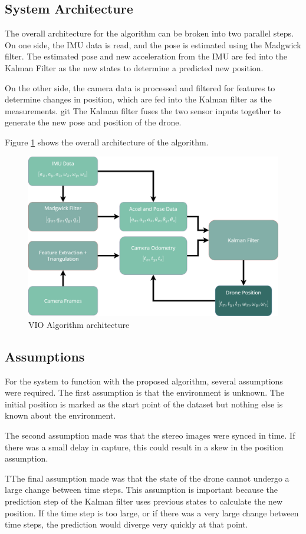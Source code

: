 \documentclass[bare_jrnl_transmag]{subfiles}
\begin{document}
\subsection{System Architecture}

The overall architecture for the algorithm can be broken into two parallel steps. On one side, the IMU data is read, and the pose is estimated using the Madgwick filter. The estimated pose and new acceleration from the IMU are fed into the Kalman Filter as the new states to determine a predicted new position. 

On the other side, the camera data is processed and filtered for features to determine changes in position, which are fed into the Kalman filter as the measurements.
git 
The Kalman filter fuses the two sensor inputs together to generate the new pose and position of the drone. 

Figure \ref{fig:vio-arch} shows the overall architecture of the algorithm. 

\begin{figure}
    [H]
    \centering
    \includegraphics[width=0.8\linewidth]{figures/VIO-arch.png}
    \caption{VIO Algorithm architecture}
    \label{fig:vio-arch}
\end{figure}


\subsection{Assumptions}

For the system to function with the proposed algorithm, several assumptions were required. 
The first assumption is that the environment is unknown. The initial position is marked as the start point of the dataset but nothing else is known about the environment.

The second assumption made was that the stereo images were synced in time. If there was a small delay in capture, this could result in a skew in the position assumption.

TThe final assumption made was that the state of the drone cannot undergo a large change between time steps. This assumption is important because the prediction step of the Kalman filter uses previous states to calculate the new position. If the time step is too large, or if there was a very large change between time steps, the prediction would diverge very quickly at that point.  
\end{document}
